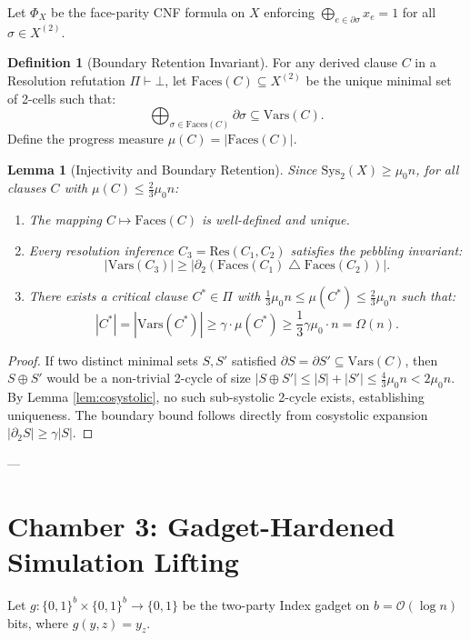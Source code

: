 \documentclass[11pt,a4paper]{article}
\theoremstyle{plain}
\newtheorem{lemma}[theorem]{Lemma}
\theoremstyle{definition}
\newtheorem{definition}[theorem]{Definition}
\theoremstyle{remark}
\newcommand{\Faces}{\mathrm{Faces}}
\newcommand{\Vars}{\mathrm{Vars}}
\begin{document}
Let $\Phi_X$ be the face-parity CNF formula on $X$ enforcing $\bigoplus_{e \in \partial \sigma} x_e = 1$ for all $\sigma \in X^{(2)}$.

\begin{definition}[Boundary Retention Invariant]
For any derived clause $C$ in a Resolution refutation $\Pi \vdash \bot$, let $\Faces(C) \subseteq X^{(2)}$ be the unique minimal set of 2-cells such that:
\[
\bigoplus_{\sigma \in \Faces(C)} \partial \sigma \subseteq \Vars(C).
\]
Define the progress measure $\mu(C) = |\Faces(C)|$.
\end{definition}

\begin{lemma}[Injectivity and Boundary Retention]\label{lem:boundary_retention}
Since $\mathrm{Sys}_2(X) \ge \mu_0 n$, for all clauses $C$ with $\mu(C) \le \frac{2}{3}\mu_0 n$:
\begin{enumerate}
    \item The mapping $C \mapsto \Faces(C)$ is well-defined and unique.
    \item Every resolution inference $C_3 = \mathrm{Res}(C_1, C_2)$ satisfies the pebbling invariant:
    \[
    |\Vars(C_3)| \ge |\partial_2 (\Faces(C_1) \mathbin{\triangle} \Faces(C_2))|.
    \]
    \item There exists a critical clause $C^* \in \Pi$ with $\frac{1}{3}\mu_0 n \le \mu(C^*) \le \frac{2}{3}\mu_0 n$ such that:
    \[
    |C^*| = |\Vars(C^*)| \ge \gamma \cdot \mu(C^*) \ge \frac{1}{3}\gamma \mu_0 \cdot n = \Omega(n).
    \]
\end{enumerate}
\end{lemma}

\begin{proof}
If two distinct minimal sets $S, S'$ satisfied $\partial S = \partial S' \subseteq \Vars(C)$, then $S \oplus S'$ would be a non-trivial 2-cycle of size $|S \oplus S'| \le |S| + |S'| \le \frac{4}{3}\mu_0 n < 2\mu_0 n$. By Lemma \ref{lem:cosystolic}, no such sub-systolic 2-cycle exists, establishing uniqueness. The boundary bound follows directly from cosystolic expansion $|\partial_2 S| \ge \gamma |S|$.
\end{proof}

---

\section{Chamber 3: Gadget-Hardened Simulation Lifting}

Let $g: \{0,1\}^b \times \{0,1\}^b \to \{0,1\}$ be the two-party Index gadget on $b = \mathcal{O}(\log n)$ bits, where $g(y, z) = y_z$.
\end{document}
